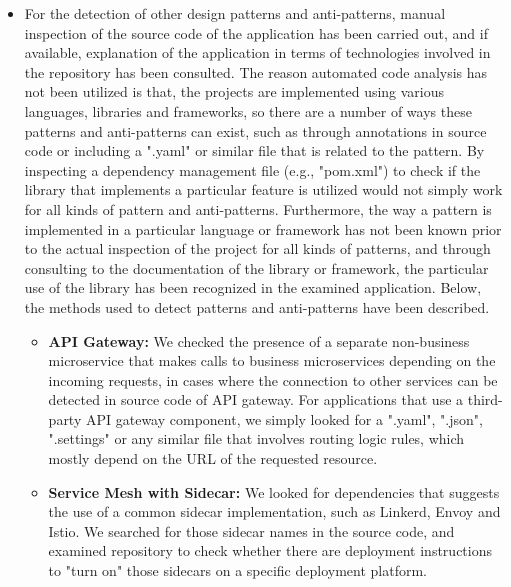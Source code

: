\documentclass{Configuration_Files/PoliMi3i_thesis}
\begin{document}
\begin{itemize}
    \item For the detection of other design patterns and anti-patterns, manual inspection of the source code of the application has been carried out, and if available, explanation of the application in terms of technologies involved in the repository has been consulted.
    The reason automated code analysis has not been utilized is that, the projects are implemented using various languages, libraries and frameworks, so there are a number of ways these patterns and anti-patterns can exist, such as through annotations in source code or including a ".yaml" or similar file that is related to the pattern.
    By inspecting a dependency management file (e.g., "pom.xml") to check if the library that implements a particular feature is utilized would not simply work for all kinds of pattern and anti-patterns.
    Furthermore, the way a pattern is implemented in a particular language or framework has not been known prior to the actual inspection of the project for all kinds of patterns, and through consulting to the documentation of the library or framework, the particular use of the library has been recognized in the examined application.
    Below, the methods used to detect patterns and anti-patterns have been described.
    
    \begin{itemize}
        \item \textbf{API Gateway:} We checked the presence of a separate non-business microservice that makes calls to business microservices depending on the incoming requests, in cases where the connection to other services can be detected in source code of API gateway.
        For applications that use a third-party API gateway component, we simply looked for a ".yaml", ".json", ".settings" or any similar file that involves routing logic rules, which mostly depend on the URL of the requested resource.
        
        \item \textbf{Service Mesh with Sidecar:} We looked for dependencies that suggests the use of a common sidecar implementation, such as Linkerd, Envoy and Istio.
        We searched for those sidecar names in the source code, and examined repository to check whether there are deployment instructions to "turn on" those sidecars on a specific deployment platform.
        

\end{itemize}
\end{itemize}
\end{document}
